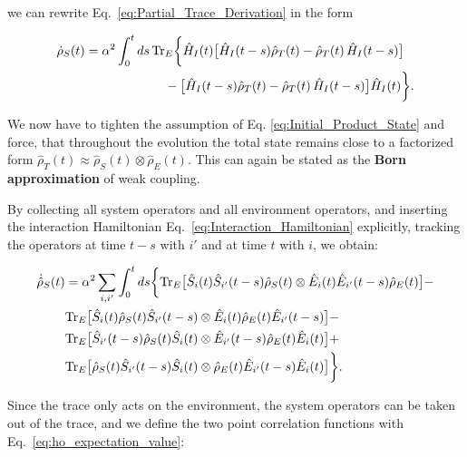 \noindent
we can rewrite Eq.~\eqref{eq:Partial_Trace_Derivation} in the form

\begin{align}
	\dot{\rho}_S(t) & = \alpha^2 \int_0^t ds \, \mathrm{Tr}_E \bigg\{
	\hat{H}_I(t) \big[ \hat{H}_I(t-s) \hat{\rho}_T(t) - \hat{\rho}_T(t) \, \hat{H}_I(t-s) \big] \notag                                   \\
	                & \qquad\qquad\qquad\; - \big[ \hat{H}_I(t-s) \hat{\rho}_T(t) - \hat{\rho}_T(t) \, \hat{H}_I(t-s) \big] \hat{H}_I(t)
	\bigg\}.
	\label{eq:Second_Order_Final_Expression}
\end{align}

\noindent
We now have to tighten the assumption of Eq. \eqref{eq:Initial_Product_State} and force, that throughout the evolution the total state remains close to a factorized form $\hat{\rho}_T(t) \approx \hat{\rho}_S(t) \otimes \hat{\rho}_E(t)$. This can again be stated as the \textbf{Born approximation} of weak coupling.

\noindent
By collecting all system operators and all environment operators, and inserting the interaction Hamiltonian Eq.~\eqref{eq:Interaction_Hamiltonian} explicitly, tracking the operators at time $t - s$ with $i'$ and at time $t$ with $i$, we obtain:

\begin{align}
	\dot{\hat{\rho}}_S(t) & = \alpha^2  \sum_{i, i'} \int_0^t ds
	\bigg\{
	\mathrm{Tr}_E \big[ \hat{S}_i(t) \hat{S}_{i'}(t-s) \hat{\rho}_S(t)      \otimes   \hat{E}_{i}(t) \hat{E}_{i'}(t-s) \hat{\rho}_E(t)  \big] -  \notag                         \\
	                      & \mathrm{Tr}_E \big[ \hat{S}_i(t) \hat{\rho}_S(t) \hat{S}_{i'}(t-s)      \otimes   \hat{E}_{i}(t) \hat{\rho}_E(t) \hat{E}_{i'}(t-s)  \big] - \notag \\
	                      & \mathrm{Tr}_E \big[ \hat{S}_{i'}(t-s) \hat{\rho}_S(t) \hat{S}_i(t)      \otimes   \hat{E}_{i'}(t-s) \hat{\rho}_E(t) \hat{E}_{i}(t)  \big] +  \notag \\
	                      & \mathrm{Tr}_E \big[ \hat{\rho}_S(t) \hat{S}_{i'}(t-s) \hat{S}_i(t)      \otimes   \hat{\rho}_E(t) \hat{E}_{i'}(t-s) \hat{E}_{i}(t)  \big]
	\bigg\}.
	\label{eq:Interaction_Hamiltonian_Expansion}
\end{align}

\noindent
Since the trace only acts on the environment, the system operators can be taken out of the trace, and we define the two point correlation functions with Eq.~\eqref{eq:ho_expectation_value}:

